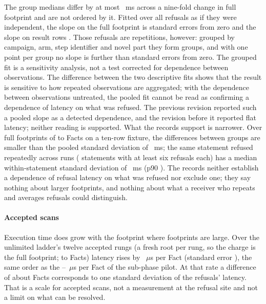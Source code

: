 \documentclass[journal,onecolumn]{IEEEtran}
\begin{document}
The group medians differ by at most \TimingFullSpreadMS{}~ms across a
nine-fold change in full footprint and are not ordered by it. Fitted over
all refusals as if they were independent, the slope on the full footprint is
\TimingFullPooledOverSE{} standard errors from zero and the slope on result
rows \TimingRowsPooledOverSE{}. Those refusals are repetitions, however:
grouped by campaign, arm, step identifier and novel part they form
\TimingStatementPoints{} groups, and with one point per group no slope is
further than \TimingStatementOverSEMax{} standard errors from zero. The
grouped fit is a sensitivity analysis, not a test corrected for dependence
between observations. The difference between the two descriptive fits shows
that the result is sensitive to how repeated observations are aggregated;
with the dependence between observations untreated, the pooled fit cannot
be read as confirming a dependence of latency on what was refused. The
previous revision reported such a pooled slope as a detected dependence, and
the revision before it reported flat latency; neither reading is supported. What the records support is narrower. Over full
footprints of \TimingFullMin{} to \TimingFullMax{} Facts on a ten-row
fixture, the differences between groups are smaller than the pooled standard
deviation of \TimingPooledSDMS{}~ms; the same statement refused repeatedly
across runs (\TimingWithinStepGroups{} statements with at least six refusals
each) has a median within-statement standard deviation of
\TimingWithinStepSDMS{}~ms (p90 \TimingWithinStepSDPNinetyMS{}). The records
neither establish a dependence of refusal latency on what was refused nor
exclude one; they say nothing about larger footprints, and nothing about
what a receiver who repeats and averages refusals could distinguish.

\paragraph{Accepted scans}
Execution time does grow with the footprint where footprints are large. Over
the unlimited ladder's twelve accepted rungs (a fresh root per rung, so the
charge is the full footprint; \TimingLadderFactsMin{} to
\TimingLadderFactsMax{} Facts) latency rises by
\TimingMicrosPerFact{}~$\mu$s per Fact (standard error
\TimingMicrosPerFactSE{}), the same order as the
\FinalVFiveSubphaseMicrosPerFactSSixHundredKByteSixteen{}--\FinalVFiveSubphaseMicrosPerFactSTwoSFTen{}~$\mu$s
per Fact of the sub-phase pilot. At that rate a difference of about
\TimingFactsPerNoiseSD{} Facts corresponds to one standard deviation of the
refusals' latency. That is a scale for accepted scans, not a measurement at
the refusal site and not a limit on what can be resolved.
\end{document}
